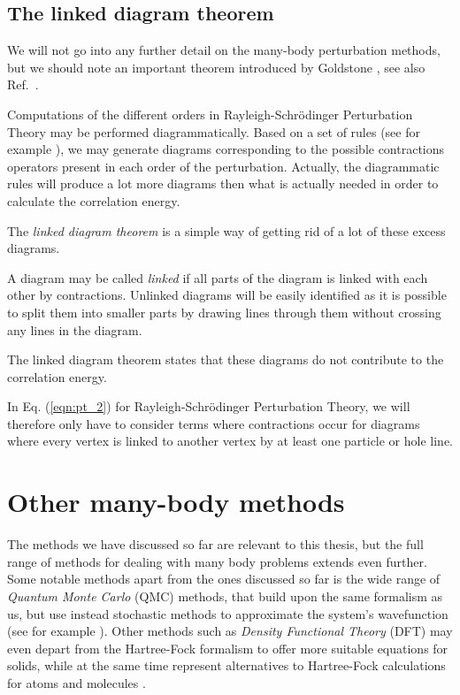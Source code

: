 \subsection{The linked diagram theorem}

We will not go into any further detail on the many-body perturbation
methods, but we should note an important theorem introduced by
Goldstone \cite{Goldstone1957}, see also Ref.~\cite[p.152]{ShavittBartlett2009}.

Computations of the different orders in Rayleigh-Schrödinger
Perturbation Theory may be performed diagrammatically. Based on a set
of rules (see for example \cite{ShavittBartlett2009}), we may generate
diagrams corresponding to the possible contractions operators
present in each order of the perturbation. Actually, the diagrammatic
rules will produce a lot more diagrams then what is actually needed in
order to calculate the correlation energy.

The \emph{linked diagram theorem} is a simple way of getting rid of a lot of these excess diagrams.

A diagram may be called \emph{linked} if all parts of the diagram is
linked with each other by contractions. Unlinked diagrams will be
easily identified as it is possible to split them into smaller parts
by drawing lines through them without crossing any lines in the
diagram.

The linked diagram theorem states that these diagrams do not contribute to the correlation energy. 

In Eq. (\ref{eqn:pt_2}) for Rayleigh-Schrödinger Perturbation Theory, we will therefore only have to consider terms where contractions occur for diagrams where every vertex is linked to another vertex by at least one particle or hole line.

\section{Other many-body methods}

The methods we have discussed so far are relevant to this thesis, but the full range of methods for dealing with many body problems extends even further. Some notable methods apart from the ones discussed so far is the wide range of \emph{Quantum Monte Carlo} (QMC) methods, that build upon the same formalism as us, but use instead stochastic methods to approximate the system's wavefunction (see for example \cite[Chapter 12]{Thijssen}). Other methods such as \emph{Density Functional Theory} (DFT) may even depart from the Hartree-Fock formalism to offer more suitable equations for solids, while at the same time represent alternatives to Hartree-Fock calculations for atoms and molecules \cite[Chapter 5]{Thijssen}.
